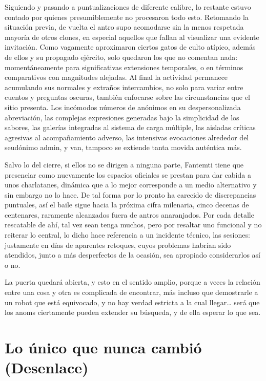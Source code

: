 \documentclass[
]{book}
\begin{document}
Siguiendo y pasando a puntualizaciones de diferente calibre, lo restante estuvo contado por quienes presumiblemente no procesaron todo esto. Retomando la situación previa, de vuelta el antro supo acomodarse sin la menos respetada mayoría de otros clones, en especial aquellos que fallan al visualizar una evidente invitación. Como vagamente aproximaron ciertos gatos de culto atípico, además de ellos y su propagado ejército, solo quedaron los que no comentan nada: momentáneamente para significativas extensiones temporales, o en términos comparativos con magnitudes alejadas. Al final la actividad permanece acumulando sus normales y extraños intercambios, no solo para variar entre cuentos y preguntas oscuras, también enfocarse sobre las circunstancias que el sitio presenta. Los incómodos números de anónimos en su despersonalizada abreviación, las complejas expresiones generadas bajo la simplicidad de los sabores, las galerías integradas al sistema de carga múltiple, las aisladas críticas agresivas al acompañamiento adverso, las intensivas evocaciones alrededor del seudónimo admin, y van, tampoco se extiende tanta movida auténtica más.

Salvo lo del cierre, si ellos no se dirigen a ninguna parte, Fantemti tiene que presenciar como nuevamente los espacios oficiales se prestan para dar cabida a unos charlatanes, dinámica que a lo mejor corresponde a un medio alternativo y sin embargo no lo hace. De tal forma por lo pronto ha carecido de discrepancias puntuales, así el baile sigue hacia la próxima cifra milenaria, cinco decenas de centenares, raramente alcanzados fuera de antros anaranjados. Por cada detalle rescatable de ahí, tal vez sean tenga muchos, pero por resaltar uno funcional y no reiterar lo central, lo dicho hace referencia a un incidente técnico, las sesiones: justamente en días de aparentes retoques, cuyos problemas habrían sido atendidos, junto a más desperfectos de la ocasión, sea apropiado considerarlos así o no.

La puerta quedará abierta, y esto en el sentido amplio, porque a veces la relación entre una cosa y otra es complicada de encontrar, más incluso que demostrarle a un robot que está equivocado, y no hay verdad estricta a la cual llegar\ldots{} será que los anoms ciertamente pueden extender su búsqueda, y de ella esperar lo que sea.

\hypertarget{lo-uxfanico-que-nunca-cambiuxf3-desenlace}{%
\chapter{Lo único que nunca cambió (Desenlace)}\label{lo-uxfanico-que-nunca-cambiuxf3-desenlace}}
\end{document}
